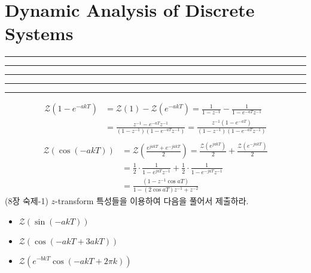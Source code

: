 \setcounter{chapter}{7}
\setcounter{section}{1}
\section{Dynamic Analysis of Discrete Systems}
\vspace{-8pt} \hrule \hrule \hrule \hrule \hrule  \vspace{12pt}


				\begin{align*}
							\mathcal{Z}(1-e^{-akT}) &= \mathcal{Z}(1) - \mathcal{Z}(e^{-akT}) = \frac{1}{1-z^{-1} } -  \frac{1}{1-e^{-aT}z^{-1}}\\
							                        & = \frac{z^{-1}-e^{-aT}z^{-1}}{(1-z^{-1})(1-e^{-aT}z^{-1})} =  \frac{z^{-1}(1-e^{-aT})}{(1-z^{-1})(1-e^{-aT}z^{-1})} \\
				\end{align*}
				\begin{align*}
					\mathcal{Z}(\cos(-akT))  &= \mathcal{Z}(\frac{e^{jakT}+e^{-jakT}}{2}) =\frac{\mathcal{Z}(e^{jakT})}{2} +\frac{\mathcal{Z}(e^{-jakT})}{2}  \\
					 & = \frac{1}{2} \cdot \frac{1}{1-e^{jaT}z^{-1}}  + \frac{1}{2} \cdot \frac{1}{1-e^{-jaT}z^{-1}} \\
					 & = \frac{(1- z^{-1}\cos aT )}{1-(2\cos aT)z^{-1} +z^{-2}}
				\end{align*}
			(8장 숙제-1) $z$-transform 특성들을 이용하여 다음을 풀어서 제출하라.\\
				\begin{itemize}
					\item $\mathcal{Z}(\sin(-akT))$\\
					\item $\mathcal{Z}(\cos(-akT+3akT))$\\					
					\item $\mathcal{Z}(e^{-bkT}\cos(-akT+2\pi k))$\\
				\end{itemize}

	
